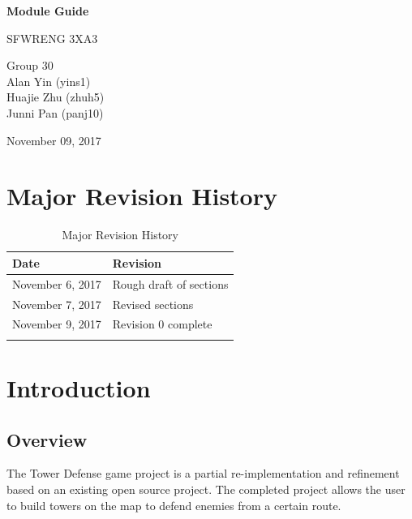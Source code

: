 \documentclass[12,english]{article}
\begin{document}
\begin{titlepage}
    \begin{center}
        \vspace*{1cm}
        
        \Huge
        \textbf{Module Guide}
        
        \vspace{0.5cm}
        \LARGE
        SFWRENG 3XA3
        
        \vspace{1.5cm}
        
\Large
        Group 30
		\\ Alan Yin (yins1)
		\\ Huajie Zhu (zhuh5)
		\\ Junni Pan (panj10)
        
        \vspace{1.5cm}
        
        \Large
        November 09, 2017
        
    \end{center}
\end{titlepage}

\newpage
\tableofcontents
\listoftables
\listoffigures
\newpage

\section{Major Revision History}
\begin{table}[!htbp]
	\begin{tabular}{|l|l|}
	    \hline
		Date & Revision\\ \hline
		November 6, 2017 & Rough draft of sections\\ \hline
		November 7, 2017 & Revised sections \\ \hline
		November 9, 2017 & Revision 0 complete\\ \hline
		\color{red}{December 6, 2017} & \color{red}{Revision 1 complete}\\ \hline
	\end{tabular}
	\caption{Major Revision History}
\end{table} \color{black}


\section{Introduction}
	\subsection{Overview}
	The Tower Defense game project is a partial re-implementation and refinement based on an existing open source project. The completed project allows the user to build towers on the map to defend enemies from a certain route.
\end{document}
